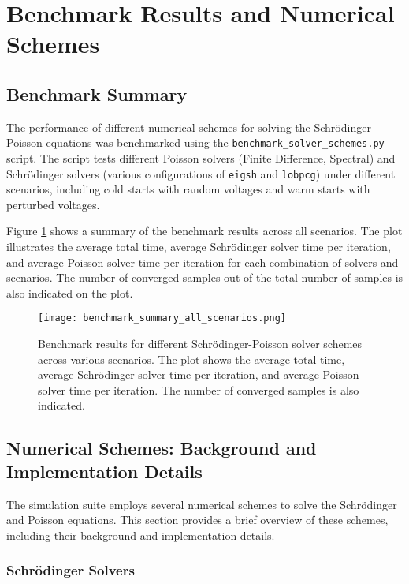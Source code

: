 \documentclass{article}
\begin{document}
\section{Benchmark Results and Numerical Schemes}

\subsection{Benchmark Summary}

The performance of different numerical schemes for solving the Schrödinger-Poisson equations was benchmarked using the \texttt{benchmark\_solver\_schemes.py} script. The script tests different Poisson solvers (Finite Difference, Spectral) and Schrödinger solvers (various configurations of \texttt{eigsh} and \texttt{lobpcg}) under different scenarios, including cold starts with random voltages and warm starts with perturbed voltages.

Figure \ref{fig:benchmark_summary} shows a summary of the benchmark results across all scenarios. The plot illustrates the average total time, average Schrödinger solver time per iteration, and average Poisson solver time per iteration for each combination of solvers and scenarios. The number of converged samples out of the total number of samples is also indicated on the plot.

\begin{figure}[h!]
    \centering
    \texttt{[image: benchmark\_summary\_all\_scenarios.png]}
    \caption{Benchmark results for different Schrödinger-Poisson solver schemes across various scenarios. The plot shows the average total time, average Schrödinger solver time per iteration, and average Poisson solver time per iteration. The number of converged samples is also indicated.}
    \label{fig:benchmark_summary}
\end{figure}

\subsection{Numerical Schemes: Background and Implementation Details}

The simulation suite employs several numerical schemes to solve the Schrödinger and Poisson equations. This section provides a brief overview of these schemes, including their background and implementation details.

\subsubsection{Schrödinger Solvers}
\end{document}
